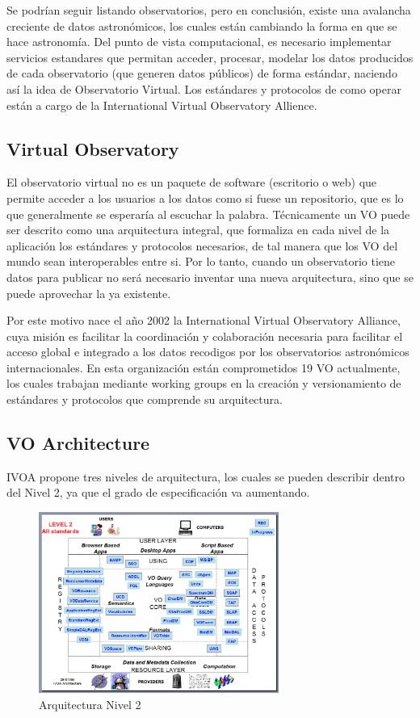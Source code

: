Se podrían seguir listando observatorios, pero en conclusión, existe una
avalancha creciente de datos astronómicos, los cuales están cambiando la forma
en que se hace astronomía. Del punto de vista computacional, es necesario
implementar servicios estandares que permitan acceder, procesar, modelar los
datos producidos de cada observatorio (que generen datos públicos) de forma
estándar, naciendo así la idea de Observatorio Virtual. Los estándares y
protocolos de como operar están a cargo de la International Virtual Observatory
Allience. 

\subsection{Virtual Observatory}
El observatorio virtual no es un paquete de software (escritorio o web) que
permite acceder a los usuarios a los datos como si fuese un repositorio, que es
lo que generalmente se esperaría al escuchar la palabra. Técnicamente un VO
puede ser descrito como una arquitectura integral, que formaliza en cada
nivel de la aplicación los estándares y protocolos necesarios, de tal manera
que los VO del mundo sean interoperables entre si. Por lo tanto, cuando un
observatorio tiene datos para publicar no será necesario inventar una nueva
arquitectura, sino que se puede aprovechar la ya existente.

Por este motivo nace el año 2002 la International Virtual Observatory Alliance,
cuya misión es facilitar la coordinación y colaboración necesaria para
facilitar el acceso global e integrado a los datos recodigos por los
observatorios astronómicos internacionales. En esta organización están
comprometidos 19 VO actualmente, los cuales trabajan mediante working groups en
la creación y versionamiento de estándares y protocolos que comprende su
arquitectura.

\subsection{VO Architecture}

IVOA propone tres niveles de arquitectura, los cuales se pueden describir
dentro del Nivel 2, ya que el grado de especificación va aumentando.

\begin{figure}[h!t]
    \centering
    \includegraphics[width=0.7\textwidth]{img/arquitectura_2.png}
    \caption{Arquitectura Nivel 2}
    \label{fig:nivel2}
\end{figure}

